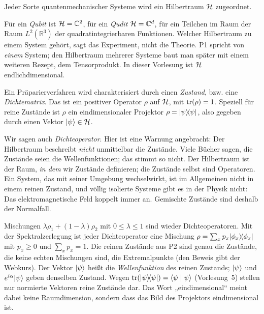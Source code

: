 \begin{merksatz}[P1]
	Jeder Sorte quantenmechanischer Systeme wird ein Hilbertraum $\mathcal{H}$ zugeordnet.
\end{merksatz}
Für ein \emph{Qubit} ist $\mathcal{H} = \mathbb{C}^2$, für ein \emph{Qudit} $\mathcal{H} = \mathbb{C}^d$, für ein Teilchen im Raum der Raum $L^2(\mathbb{R}^3)$ der quadratintegrierbaren Funktionen. Welcher Hilbertraum zu einem System gehört, sagt das Experiment, nicht die Theorie. P1 spricht von \emph{einem} System; den Hilbertraum mehrerer Systeme baut man später mit einem weiteren Rezept, dem Tensorprodukt. In dieser Vorlesung ist $\mathcal{H}$ endlichdimensional.

\begin{merksatz}[P2]
	Ein Präparierverfahren wird charakterisiert durch einen \emph{Zustand}, bzw. eine \emph{Dichtematrix}. Das ist ein positiver Operator $\rho$ auf $\mathcal{H}$, mit $\operatorname{tr}(\rho) = 1$. Speziell für reine Zustände ist $\rho$ ein eindimensionaler Projektor $\rho = \lvert \psi \rangle\!\langle \psi \rvert$, also gegeben durch einen Vektor $\lvert \psi \rangle \in \mathcal{H}$.
\end{merksatz}
Wir sagen auch \emph{Dichteoperator}. Hier ist eine Warnung angebracht: Der Hilbertraum beschreibt \emph{nicht} unmittelbar die Zustände. Viele Bücher sagen, die Zustände seien die Wellenfunktionen; das stimmt so nicht. Der Hilbertraum ist der Raum, \emph{in dem} wir Zustände definieren; die Zustände selbst sind Operatoren. Ein System, das mit seiner Umgebung wechselwirkt, ist im Allgemeinen nicht in einem reinen Zustand, und völlig isolierte Systeme gibt es in der Physik nicht: Das elektromagnetische Feld koppelt immer an. Gemischte Zustände sind deshalb der Normalfall.

Mischungen $\lambda\rho_1 + (1-\lambda)\rho_2$ mit $0\leq\lambda\leq 1$ sind wieder Dichteoperatoren. Mit der Spektralzerlegung ist jeder Dichteoperator eine Mischung $\rho = \sum_x p_x\lvert \phi_x \rangle\!\langle \phi_x \rvert$ mit $p_x\geq 0$ und $\sum_x p_x = 1$. Die reinen Zustände aus P2 sind genau die Zustände, die keine echten Mischungen sind, die Extremalpunkte (den Beweis gibt der Webkurs). Der Vektor $\lvert \psi \rangle$ heißt die \emph{Wellenfunktion} des reinen Zustands; $\lvert \psi \rangle$ und $e^{i\alpha}\lvert \psi \rangle$ geben denselben Zustand. Wegen $\operatorname{tr}(\lvert \psi \rangle\!\langle \psi \rvert) = \langle \psi \mid \psi \rangle$ (Vorlesung~5) stellen nur normierte Vektoren reine Zustände dar. Das Wort „eindimensional“ meint dabei keine Raumdimension, sondern dass das Bild des Projektors eindimensional ist.


